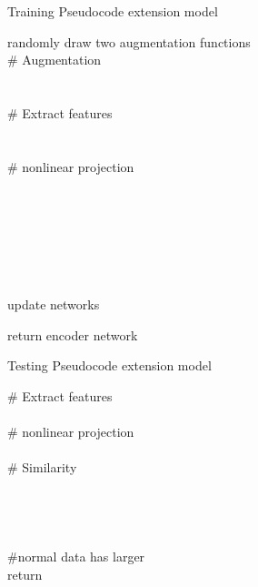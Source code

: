 \documentclass[journal]{IEEEtran}
\theoremstyle{remark}
\begin{document}
\begin{algorithm}
  \caption{Training Pseudocode extension model}
  \label{alg::Training Pseudocode extension model} 
  \footnotesize
  {
        {
            randomly draw two augmentation functions \\
            \# Augmentation\\
            \\
            \\
            \# Extract features\\
            \\
            \\
            \# nonlinear projection\\
            \\
            \\
            
        }
        
        \\
        \\
        \\
        \\
        update networks 
    }
    return encoder network  
\end{algorithm}

\begin{algorithm}
  \caption{Testing Pseudocode extension model}
  \label{alg::Testing Pseudocode extension model} 
  \footnotesize
    {
        {
            \# Extract features\\
            \\
            \# nonlinear projection\\
            \\
            
        }
        {   
            \# Similarity\\
            \\
            \\
            \\
             \\
            \#normal data has larger  \\
        }
    }
    return 
\end{algorithm}
\end{document}
